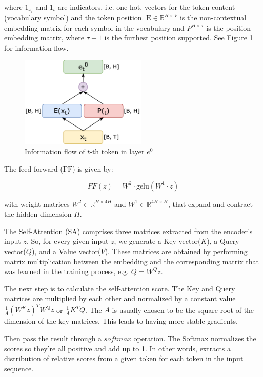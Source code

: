 where $\mathrm{1}_{x_t}$ and $\mathrm{1}_t$ are indicators, i.e. one-hot, vectors for the token content (vocabulary symbol) and the token position. $\mathrm{E} \in \mathbb{R}^{H \times V}$ is the non-contextual embedding matrix for each symbol in the vocabulary and $P^{H \times \tau}$ is the position embedding matrix, where  $\tau-1$ is the furthest position supported. See Figure \ref{fig:e0} for information flow. \\


\begin{figure}[h]
    \centering
    \includegraphics[width=6cm]{pages/imgs/e0.png}
    \caption{Information flow of $t$-th token in layer $e^0$}
    \label{fig:e0}
\end{figure}



\noindent The feed-forward ($\mathrm{FF}$) is given by:

\begin{equation}
FF(z) = W^2\cdot \mathrm{gelu}(W^1 \cdot z)
\end{equation}

\noindent with weight matrices $W^2 \in \mathbb{R}^{H \times 4H}$ and $W^1 \in \mathbb{R}^{4H \times H}$, that expand and contract the hidden dimension $H$.

The Self-Attention ($\mathrm{SA}$) comprises three matrices extracted from the encoder’s input $z$. So, for every given input $z$, we generate a Key vector($K$), a Query vector($Q$), and a Value vector($V$). These matrices are obtained by performing matrix multiplication between the embedding and the corresponding matrix that was learned in the training process, e.g. $Q = W^Q z$.

The next step is to calculate the self-attention score. The Key and Query matrices are multiplied by each other and normalized by a constant value $\frac{1}{A} \left(W^K z\right)^T W^Q z$ or $\frac{1}{A} K^T Q$. The $A$ is usually chosen to be the square root of the dimension of the key matrices. This leads to having more stable gradients.

\noindent Then pass the result through a $softmax$ operation. The Softmax normalizes the scores so they’re all positive and add up to 1. In other words, extracts a distribution of relative scores from a given token for each token in the input sequence.

